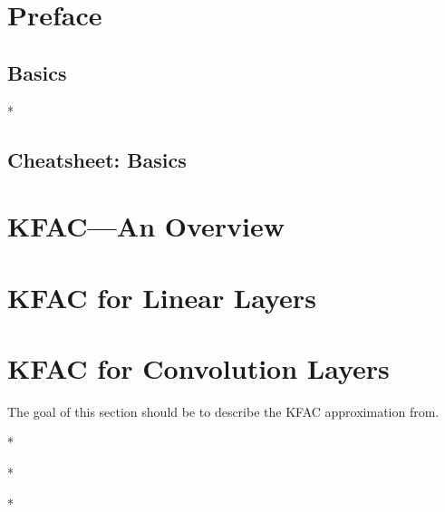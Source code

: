 \documentclass{article}
\begin{document}
\onecolumn


\clearpage

\tableofcontents
\clearpage

\section{Preface}

\clearpage

\begin{paracol}{2}
  \section{Basics}
  

  \switchcolumn[0]*
\end{paracol}

\clearpage
\begin{paracol}{1}
  \section{Cheatsheet: Basics}
  
\end{paracol}
\clearpage

\begin{paracol}{2}
  \section{KFAC---An Overview}
  

  \section{KFAC for Linear Layers}
  

  \section{KFAC for Convolution Layers}
  The goal of this section should be to describe the KFAC approximation from.

  \switchcolumn[1]*
  \switchcolumn[0]

  \switchcolumn[1]*
  \switchcolumn[0]

  \switchcolumn[1]*
  \switchcolumn[0]
\end{paracol}
\end{document}
